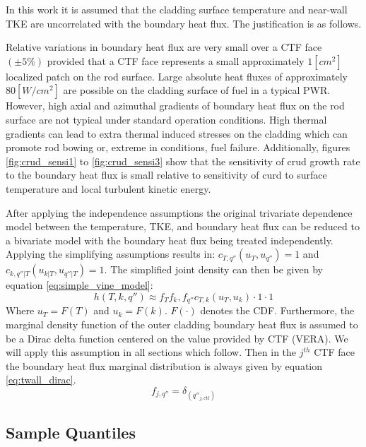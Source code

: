 In this work it is assumed that the cladding surface temperature and near-wall TKE are uncorrelated with the boundary heat flux.  The justification is as follows.

Relative variations in boundary heat flux are very small over a CTF face $(\pm 5\%)$ provided that a CTF face represents a small approximately $1 [cm^2]$ localized patch on the rod surface.  Large absolute heat fluxes of approximately $80 [W/cm^2]$ are possible on the cladding surface of fuel in a typical PWR.  However, high axial and azimuthal gradients of boundary heat flux on the rod surface are not typical under standard operation conditions.  High thermal gradients can lead to extra thermal induced stresses on the cladding which can promote rod bowing or, extreme in conditions, fuel failure.
Additionally, figures \ref{fig:crud_sensi1} to \ref{fig:crud_sensi3} show that the sensitivity of crud growth rate to the boundary heat flux is small relative to sensitivity of curd to surface temperature and local turbulent kinetic energy.


After applying the independence assumptions the original trivariate dependence model between the temperature, TKE, and boundary heat flux can be reduced to a bivariate model with the boundary heat flux being treated independently.  Applying the simplifying assumptions results in: $c_{T,q''}(u_T, u_{q''}) = 1$ and $c_{k,q''|T}(u_{k|T}, u_{q''|T}) = 1$. The simplified joint density can then be given by equation \ref{eq:simple_vine_model}:
\begin{equation}
h(T, k, q'') \approx  f_T f_k, f_{q''} c_{T,k}(u_{T}, u_{k})  \cdot 1 \cdot 1
\label{eq:simple_vine_model}
\end{equation}
Where $u_T=F(T)$ and $u_k = F(k)$. $F(\cdot)$ denotes the CDF.
Furthermore, the marginal density function of the outer cladding boundary heat flux is assumed to be a Dirac delta function centered on the value provided by CTF (VERA).  We will apply this assumption in all sections which follow.
Then in the $j^{th}$ CTF face the boundary heat flux marginal distribution is always given by equation \ref{eq:twall_dirac}.
\begin{equation}
f_{j,q''} = \delta_{(q''_{j, \mathrm{ctf}})}
\label{eq:twall_dirac}
\end{equation}





\subsection{Sample Quantiles}
\label{chap:quantiles}

